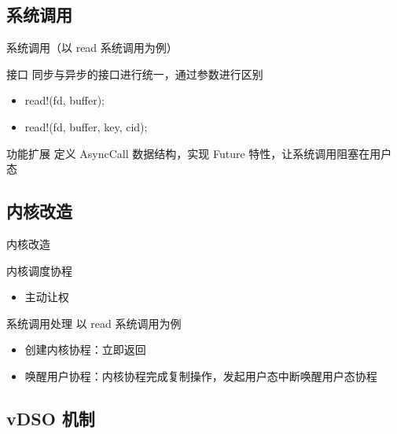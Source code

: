 \documentclass{beamer}
\begin{document}
\subsection{系统调用}

\begin{frame}{系统调用（以 read 系统调用为例）}
  \begin{block}{接口}
    同步与异步的接口进行统一，通过参数进行区别
    \begin{itemize}
      \item {read!(fd, buffer);}
      \item {read!(fd, buffer, key, cid);}
    \end{itemize}
  \end{block}
  \begin{block}{功能扩展}
    定义 AsyncCall 数据结构，实现 Future 特性，让系统调用阻塞在用户态
  \end{block}
\end{frame}

\subsection{内核改造}

\begin{frame}{内核改造}
  \begin{block}{内核调度协程}
    \begin{itemize}
      \item 主动让权
    \end{itemize}
  \end{block}
  \begin{block}{系统调用处理}
    以 read 系统调用为例 
    \begin{itemize}
      \item 创建内核协程：立即返回
      \item 唤醒用户协程：内核协程完成复制操作，发起用户态中断唤醒用户态协程
    \end{itemize}
  \end{block}
\end{frame}

\subsection{vDSO 机制}
\end{document}
